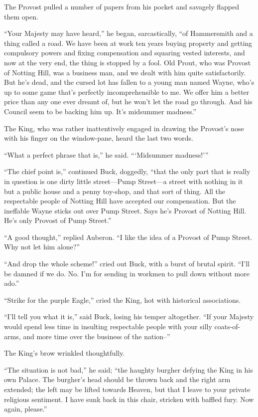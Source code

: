 \documentclass{book}
\begin{document}
The Provost pulled a number of papers from his pocket and savagely flapped them open.

“Your Majesty may have heard,” he began, sarcastically, “of Hammersmith and a thing called a road. We have been at work ten years buying property and getting compulsory powers and fixing compensation and squaring vested interests, and now at the very end, the thing is stopped by a fool. Old Prout, who was Provost of Notting Hill, was a business man, and we dealt with him quite satisfactorily. But he’s dead, and the cursed lot has fallen to a young man named Wayne, who’s up to some game that’s perfectly incomprehensible to me. We offer him a better price than any one ever dreamt of, but he won’t let the road go through. And his Council seem to be backing him up. It’s midsummer madness.”

The King, who was rather inattentively engaged in drawing the Provost’s nose with his finger on the window-pane, heard the last two words.

“What a perfect phrase that is,” he said. “‘Midsummer madness!’”

“The chief point is,” continued Buck, doggedly, “that the only part that is really in question is one dirty little street—Pump Street—a street with nothing in it but a public house and a penny toy-shop, and that sort of thing. All the respectable people of Notting Hill have accepted our compensation. But the ineffable Wayne sticks out over Pump Street. Says he’s Provost of Notting Hill. He’s only Provost of Pump Street.”

“A good thought,” replied Auberon. “I like the idea of a Provost of Pump Street. Why not let him alone?”

“And drop the whole scheme!” cried out Buck, with a burst of brutal spirit. “I’ll be damned if we do. No. I’m for sending in workmen to pull down without more ado.”

“Strike for the purple Eagle,” cried the King, hot with historical associations.

“I’ll tell you what it is,” said Buck, losing his temper altogether. “If your Majesty would spend less time in insulting respectable people with your silly coats-of-arms, and more time over the business of the nation–”

The King’s brow wrinkled thoughtfully.

“The situation is not bad,” he said; “the haughty burgher defying the King in his own Palace. The burgher’s head should be thrown back and the right arm extended; the left may be lifted towards Heaven, but that I leave to your private religious sentiment. I have sunk back in this chair, stricken with baffled fury. Now again, please.”
\end{document}
